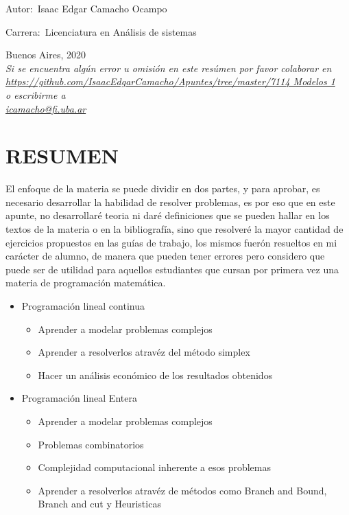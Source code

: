 \documentclass[12pt]{book}
\begin{document}
\noindent Autor:	\,Isaac Edgar Camacho Ocampo
 
\noindent Carrera:	\,Licenciatura en An\'alisis de sistemas


\vspace{1cm}

\vspace{1cm}

\noindent Buenos Aires, 2020
\vspace{1cm}
\\
\textit{Si se encuentra alg\'un error u omisi\'on en este res\'umen por favor colaborar en \\
\url{https://github.com/IsaacEdgarCamacho/Apuntes/tree/master/7114 Modelos 1} \quad \\ o escribirme a \\ 
\url{icamacho@fi.uba.ar}
}
\newpage


\tableofcontents
\chapter*{RESUMEN} %
El enfoque de la materia se puede dividir en dos partes, y para aprobar, es necesario desarrollar la habilidad de resolver problemas, es por eso que en este apunte, no desarrollaré teoria ni daré definiciones que se pueden hallar en los textos de la materia o en la bibliografía, sino que resolveré la mayor cantidad de ejercicios propuestos en las guías de trabajo, los mismos fuerón resueltos en mi carácter de alumno, de manera que pueden tener errores pero considero que puede ser de utilidad para aquellos estudiantes que cursan por primera vez una materia de programación matemática.
\begin{itemize}
\item Programación lineal continua
	\begin{itemize}
	\item Aprender a modelar problemas complejos
	\item Aprender a resolverlos atravéz del método simplex
	\item Hacer un análisis económico de los resultados obtenidos 
	\end{itemize}
\item Programación lineal Entera
	\begin{itemize}
	\item Aprender a modelar problemas complejos
	\item Problemas combinatorios
	\item Complejidad computacional inherente a esos problemas
	\item Aprender a resolverlos atravéz de métodos como Branch and Bound, Branch and cut y Heuristicas
	\end{itemize}
\end{itemize}
\end{document}
